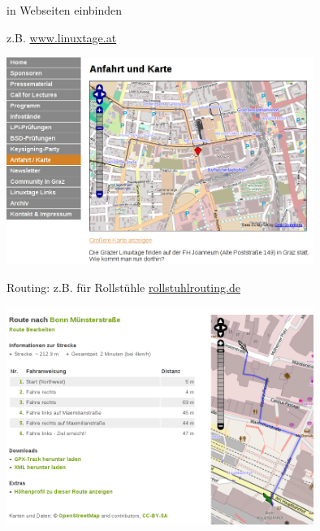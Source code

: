 \documentclass{beamer}
\begin{document}
\begin{frame}{in Webseiten einbinden}

	z.B. \url{www.linuxtage.at}

	\includegraphics[width=10cm]{glt.png}

\end{frame}

\hypersetup{urlcolor=cyan}
\begin{frame}{Routing: z.B. für Rollstühle \hfill\href{http://rollstuhlrouting.de}{rollstuhlrouting.de}}

	\includegraphics[width=10cm]{wheelchair-router.png}

\end{frame}
\hypersetup{urlcolor=blue}
\end{document}
